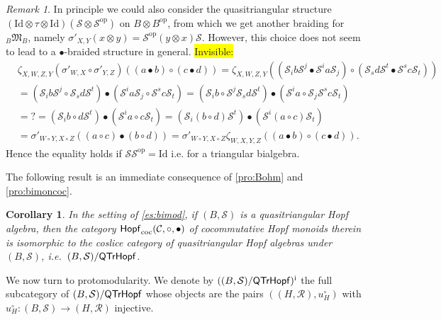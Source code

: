 \documentclass[nosumlimits,twoside]{amsart}
\newtheorem{corollary}[corollary]{\sc Corollary}
\theoremstyle{definition}
\theoremstyle{remark}
\newtheorem{remark}[remark]{\sc Remark}
\newenvironment{invisible}{{\noindent\sc \colorbox{yellow}{Invisible:}\;}\color{gray}}{\medskip}
\newcommand{\rd}[1]{{\color{red}{#1}}}
\newcommand{\id}{\mathrm{Id}}
\newcommand{\Cc}{\mathcal{C}}
\newcommand{\mm}{\mathfrak{M}}
\newcommand{\Rr}{\mathcal{R}}
\newcommand{\Ss}{\mathcal{S}}
\newcommand{\ot}{\otimes}
\def\cHopfmon{{\sf Hopf}_{\mathrm{coc}}}
\def\QTrHopf{{\sf QTrHopf}}
\newcommand{\op}{\mathrm{op}}
\begin{document}
\begin{remark}%
In principle we could also consider the quasitriangular structure $(\id\ot\tau\ot\id)(\Ss\ot\Ss^\op)$ on $B\ot B^\op$, from which we get another braiding for $_B\mm_B$, namely  $\sigma'_{X,Y}(x\ot y)=\Ss^{\op}(y \ot x)\Ss$. However, this choice does not seem to lead to a $\bullet$-braided structure in general. 
\begin{invisible}
 \begin{align*}
&\zeta _{X,W,Z,Y}\left( \sigma' _{W,X}\circ \sigma' _{Y,Z}\right) (\left(
a\bullet b\right) \circ \left( c\bullet d\right) ) 
=\zeta _{X,W,Z,Y}\left(\left(
\Ss_{i}b\mathcal{S}^{j}\bullet \Ss^{i}a%
\mathcal{S}_{j}\right) \circ \left( \Ss_{s}d\mathcal{S}%
^{t}\bullet \Ss^{s}c\mathcal{S}_{t}\right) \right) \\
&=\left( \Ss_{i}b\mathcal{S}^{j}\circ \Ss_{s}d\mathcal{S}^{t}\right) \bullet \left( \Ss^{i}a%
\mathcal{S}_{j}\circ \Ss^{s}c\mathcal{S}_{t}\right)  
=\left( \Ss_{i}b\circ \mathcal{S}^{j}\Ss_{s}d\mathcal{S}^{t}\right) \bullet \left( \Ss^{i}a\circ \mathcal{S}_{j}\Ss^{s}c\mathcal{S}_{t}\right)
\\
&=?=\left( \Ss_{i}b\circ d\mathcal{S}^{t}\right) \bullet
\left( \Ss^{i}a\circ c\mathcal{S}_{t}\right)  
=(\Ss_{i}\left( b\circ d\right) \mathcal{S}^{t})\bullet(
\Ss^{i}\left( a\circ c\right) \mathcal{S}_{t}) \\
&=\sigma' _{W\circ Y,X\circ Z}(\left( a\circ c\right) \bullet \left( b\circ
d\right))  
=\sigma' _{W\circ Y,X\circ Z}\zeta _{W,X,Y,Z}(\left( a\bullet b\right)
\circ \left( c\bullet d\right) ).
\end{align*} 
Hence the equality holds if $\Ss\Ss^\op=\id$ i.e. for a triangular bialgebra.
\end{invisible}
\end{remark}

The following result is an immediate consequence of \cref{pro:Bohm} and \cref{pro:bimoncoc}.

\begin{corollary}
\label{cor:quasiascocommutativeHopf}
In the setting of \cref{es:bimod}, if $(B,\Ss)$ is a quasitriangular Hopf algebra, then the category  $\cHopfmon(\Cc,\circ,\bullet)$ of cocommutative Hopf monoids therein is isomorphic to the coslice category of quasitriangular Hopf algebras under $(B,\Ss)$, i.e.\ $(B,\Ss)/\QTrHopf$.
\end{corollary}

We now turn to protomodularity. We denote by $((B,\Ss)/\QTrHopf)^{\mathrm{i}}$ the full subcategory of $(B,\Ss)/\QTrHopf$ whose objects are the pairs  $((H,\Rr),u_H^\circ)$ with  $u_H^\circ:(B,\Ss)\to (H,\Rr)$ injective.
\end{document}
